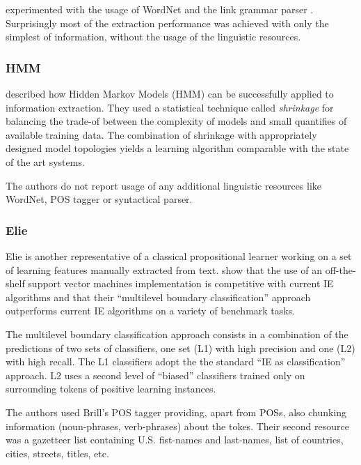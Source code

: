 \cite{Freitag:1999_phd} experimented with the usage of WordNet \citep{Miller:1995:WLD:219717.219748} and the link grammar parser \citep{linkparser}. Surprisingly most of the extraction performance was achieved with only the simplest of information, without the usage of the linguistic resources.

\subsubsection{HMM}

\cite{Freitag1999InformationExtraction} described how Hidden Markov Models (HMM) can be successfully applied to information extraction. They used a statistical technique called \emph{shrinkage} for balancing the trade-of between the complexity of models and small quantifies of available training data. The combination of shrinkage with appropriately designed model topologies yields a learning algorithm comparable with the state of the art systems.

The authors do not report usage of any additional linguistic resources like WordNet, POS tagger or syntactical parser.

\subsubsection{Elie}

Elie \citep{DBLP:conf/ecml/FinnK04} is another representative of a classical propositional learner working on a set of learning features manually extracted from text. \cite{DBLP:conf/ecml/FinnK04} show that the use of an off-the-shelf support vector machines implementation is competitive with current IE algorithms and that their ``multilevel boundary classification'' approach outperforms current IE algorithms on a variety of benchmark tasks.

The multilevel boundary classification approach consists in a combination of the predictions of two sets of classifiers, one set (L1) with high precision and one (L2) with high recall. The L1 classifiers adopt the the standard ``IE as classification'' approach. L2 uses a second level of ``biased'' classifiers trained only on surrounding tokens of positive learning instances.

The authors used Brill's POS tagger \citep{Brill:1994:ATP:199288.199378} providing, apart from POSs, also chunking information (noun-phrases, verb-phrases) about the tokes. Their second resource was a gazetteer list containing U.S. fist-names and last-names, list of countries, cities, streets, titles, etc. 

